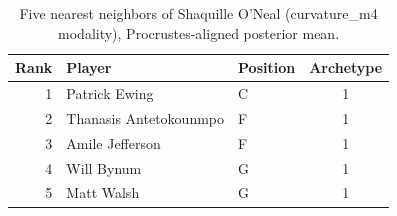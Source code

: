 \begin{table}[htbp]
  \centering\small
  \begin{tabular}{rllc}
    \toprule
    Rank & Player & Position & Archetype \\
    \midrule
    1 & Patrick Ewing & C & 1 \\
    2 & Thanasis Antetokounmpo & F & 1 \\
    3 & Amile Jefferson & F & 1 \\
    4 & Will Bynum & G & 1 \\
    5 & Matt Walsh & G & 1 \\
    \bottomrule
  \end{tabular}
  \caption{Five nearest neighbors of Shaquille O'Neal (curvature_m4 modality), Procrustes-aligned posterior mean.}
  \label{tab:Shaquille_O_Neal_neighbors_curvature_m4}
\end{table}

